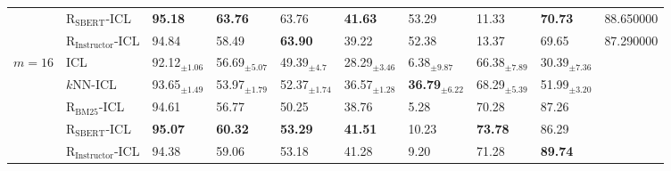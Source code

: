 \begin{tabular}{llllllllll}
 & $\text{R}_{\text{SBERT}}$-ICL & \textbf{95.18} & \textbf{63.76} & 63.76 & \textbf{41.63} & 53.29 & 11.33 & \textbf{70.73} & 88.650000 \\
 & $\text{R}_{\text{Instructor}}$-ICL & 94.84 & 58.49 & \textbf{63.90} & 39.22 & 52.38 & 13.37 & 69.65 & 87.290000 \\
\cline{1-10}
\multirow[t]{5}{*}{$m=16$} & ICL & 92.12$_{\pm1.06}$ & 56.69$_{\pm5.07}$ & 49.39$_{\pm4.7}$ & 28.29$_{\pm3.46}$ & 6.38$_{\pm9.87}$ & 66.38$_{\pm7.89}$ & 30.39$_{\pm7.36}$ &  \\
 & $k$NN-ICL & 93.65$_{\pm1.49}$ & 53.97$_{\pm1.79}$ & 52.37$_{\pm1.74}$ & 36.57$_{\pm1.28}$ & \textbf{36.79$_{\pm6.22}$} & 68.29$_{\pm5.39}$ & 51.99$_{\pm3.20}$ &  \\
 & $\text{R}_{\text{BM25}}$-ICL & 94.61 & 56.77 & 50.25 & 38.76 & 5.28 & 70.28 & 87.26 &  \\
 & $\text{R}_{\text{SBERT}}$-ICL & \textbf{95.07} & \textbf{60.32} & \textbf{53.29} & \textbf{41.51} & 10.23 & \textbf{73.78} & 86.29 &  \\
 & $\text{R}_{\text{Instructor}}$-ICL & 94.38 & 59.06 & 53.18 & 41.28 & 9.20 & 71.28 & \textbf{89.74} &  \\
\cline{1-10}
\bottomrule
\end{tabular}
